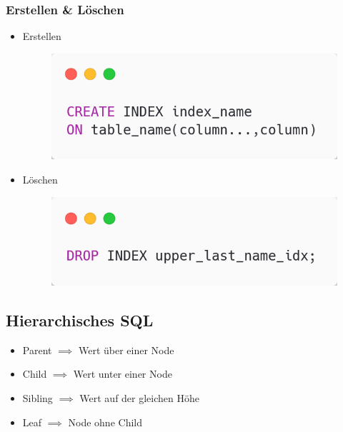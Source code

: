\subsubsection{Erstellen \& Löschen}
\begin{itemize}
    \item Erstellen
    \begin{figure}[H]
        \centering
        \includegraphics[scale=.4]{res/themenkorb_2/create_index.png} 
    \end{figure}
    \item Löschen
    \begin{figure}[H]
        \centering
        \includegraphics[scale=.4]{res/themenkorb_2/drop_index.png} 
    \end{figure}
\end{itemize}

\subsection{Hierarchisches SQL}
\begin{itemize}
    \item Parent $\implies$ Wert über einer Node
    \item Child $\implies$ Wert unter einer Node
    \item Sibling $\implies$ Wert auf der gleichen Höhe
    \item Leaf $\implies$ Node ohne Child 
\end{itemize}

